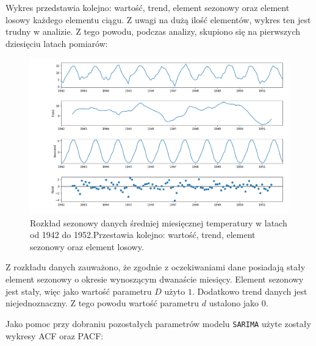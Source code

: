 \documentclass[12pt]{article}
\begin{document}
Wykres przedstawia kolejno: wartość, trend, element sezonowy oraz element losowy każdego elementu ciągu. Z uwagi na dużą ilość elementów, wykres ten jest trudny w analizie. Z tego powodu, podczas analizy, skupiono się na pierwszych dziesięciu latach pomiarów:

\begin{figure}[H]
    \includegraphics[width=\textwidth]{img/decomposition_10y.png}
    \caption{Rozkład sezonowy danych średniej miesięcznej temperatury w latach od 1942 do 1952.Przestawia kolejno: wartość, trend, element sezonowy oraz element losowy.}
\end{figure}

Z rozkładu danych zauważono, że zgodnie z oczekiwaniami dane posiadają stały element sezonowy o okresie wynoszącym dwanaście miesięcy. Element sezonowy jest stały, więc jako wartość parametru $D$ użyto $1$. Dodatkowo trend danych jest niejednoznaczny. Z tego powodu wartość parametru $d$ ustalono jako $0$.

Jako pomoc przy dobraniu pozostałych parametrów modelu \texttt{SARIMA} użyte zostały wykresy ACF oraz PACF:
\end{document}

